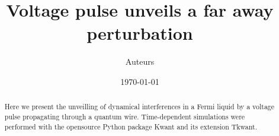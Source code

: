 \documentclass[aps,prl,preprint,groupedaddress]{revtex4-1}
\begin{document}

\title{Voltage pulse unveils a far away perturbation}


\author{Auteurs}


\date{\today}

\begin{abstract}
Here we present the unveilling of dynamical interferences in a Fermi liquid by a voltage pulse propagating through a quantum wire. Time-dependent simulations were performed with the opensource Python package Kwant and its extension Tkwant.
\end{abstract}


\maketitle

\end{document}
